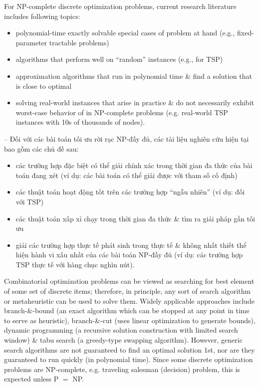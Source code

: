 \documentclass{article}
\begin{document}
For NP-complete discrete optimization problems, current research literature includes following topics:
\begin{itemize}
    \item polynomial-time exactly solvable special cases of problem at hand (e.g., fixed-parameter tractable problems)
    \item algorithms that perform well on ``random'' instances (e.g., for TSP)
    \item approximation algorithms that run in polynomial time \& find a solution that is close to optimal
    \item solving real-world instances that arise in practice \& do not necessarily exhibit worst-case behavior of in NP-complete problems (e.g. real-world TSP instances with 10s of thousands of nodes).
\end{itemize}
-- Đối với các bài toán tối ưu rời rạc NP-đầy đủ, các tài liệu nghiên cứu hiện tại bao gồm các chủ đề sau:
\begin{itemize}
    \item các trường hợp đặc biệt có thể giải chính xác trong thời gian đa thức của bài toán đang xét (ví dụ: các bài toán có thể giải được với tham số cố định)
    \item các thuật toán hoạt động tốt trên các trường hợp ``ngẫu nhiên'' (ví dụ: đối với TSP)
    \item các thuật toán xấp xỉ chạy trong thời gian đa thức \& tìm ra giải pháp gần tối ưu
    \item giải các trường hợp thực tế phát sinh trong thực tế \& không nhất thiết thể hiện hành vi xấu nhất của các bài toán NP-đầy đủ (ví dụ: các trường hợp TSP thực tế với hàng chục nghìn nút).
\end{itemize}
Combinatorial optimization problems can be viewed as searching for best element of some set of discrete items; therefore, in principle, any sort of search algorithm or metaheuristic can be used to solve them. Widely applicable approaches include branch-\&-bound (an exact algorithm which can be stopped at any point in time to serve as heuristic), branch-\&-cut (uses linear optimization to generate bounds), dynamic programming (a recursive solution construction with limited search window) \& tabu search (a greedy-type swapping algorithm). However, generic search algorithms are not guaranteed to find an optimal solution 1st, nor are they guaranteed to run quickly (in polynomial time). Since some discrete optimization problems are NP-complete, e.g. traveling salesman (decision) problem, this is expected unless P $=$ NP.
\end{document}
